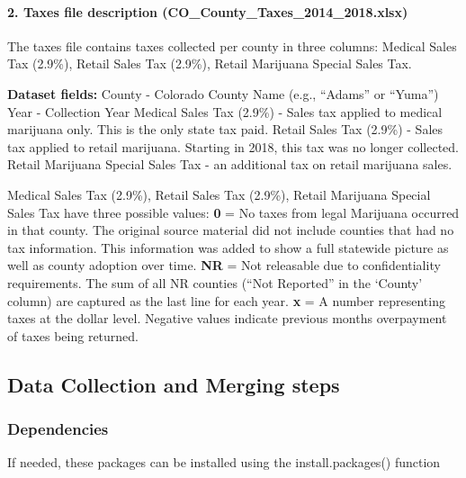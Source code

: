 \documentclass[]{article}
\let\oldparagraph\paragraph
\renewcommand{\paragraph}[1]{\oldparagraph{#1}\mbox{}}
\begin{document}
\hypertarget{taxes-file-description-co_county_taxes_2014_2018.xlsx}{%
\paragraph{\texorpdfstring{2. Taxes file description
(CO\_County\_Taxes\_2014\_2018.xlsx)}{2. Taxes file description (CO\_County\_Taxes\_2014\_2018.xlsx) }}\label{taxes-file-description-co_county_taxes_2014_2018.xlsx}}

The taxes file contains taxes collected per county in three columns:
Medical Sales Tax (2.9\%), Retail Sales Tax (2.9\%), Retail Marijuana
Special Sales Tax.

\textbf{Dataset fields:} County - Colorado County Name (e.g., ``Adams''
or ``Yuma'') Year - Collection Year Medical Sales Tax (2.9\%) - Sales
tax applied to medical marijuana only. This is the only state tax paid.
Retail Sales Tax (2.9\%) - Sales tax applied to retail marijuana.
Starting in 2018, this tax was no longer collected. Retail Marijuana
Special Sales Tax - an additional tax on retail marijuana sales.

Medical Sales Tax (2.9\%), Retail Sales Tax (2.9\%), Retail Marijuana
Special Sales Tax have three possible values: \textbf{0} = No taxes from
legal Marijuana occurred in that county. The original source material
did not include counties that had no tax information. This information
was added to show a full statewide picture as well as county adoption
over time. \textbf{NR} = Not releasable due to confidentiality
requirements. The sum of all NR counties (``Not Reported'' in the
`County' column) are captured as the last line for each year. \textbf{x}
= A number representing taxes at the dollar level. Negative values
indicate previous months overpayment of taxes being returned.

\hypertarget{data-collection-and-merging-steps}{%
\subsection{Data Collection and Merging
steps}\label{data-collection-and-merging-steps}}

\hypertarget{dependencies}{%
\subsubsection{Dependencies}\label{dependencies}}

If needed, these packages can be installed using the install.packages()
function
\end{document}
